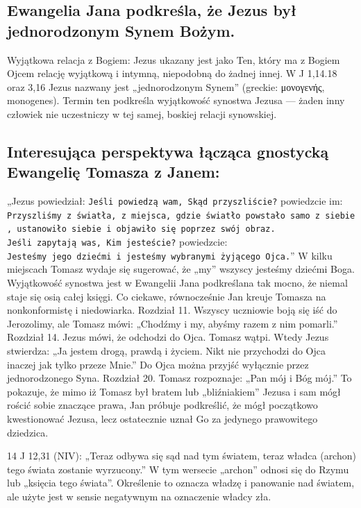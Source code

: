 \subsection{Ewangelia Jana podkreśla, że Jezus był jednorodzonym Synem Bożym.}\label{subsec:the-gospel-of-john-emphasizes-the-jesus-was-the-only-begotten-son-of-god.}

Wyjątkowa relacja z Bogiem:
Jezus ukazany jest jako Ten, który ma z Bogiem Ojcem relację wyjątkową i intymną, niepodobną do żadnej innej.
W J 1,14.18 oraz 3,16 Jezus nazwany jest „jednorodzonym Synem” (greckie: μονογενής, monogenes).
Termin ten podkreśla wyjątkowość synostwa Jezusa — żaden inny człowiek nie uczestniczy w tej samej, boskiej relacji synowskiej.

\subsection{Interesująca perspektywa łącząca gnostycką Ewangelię Tomasza z Janem:}\label{subsec:here-there-is-a-very-interesting-perspective-linking-the-gnostic-gospel-of-thomas-with-john}

„Jezus powiedział: \texttt{Jeśli\ powiedzą\ wam,\ Skąd\ przyszliście?} powiedzcie im: \texttt{Przyszliśmy\ z\ światła,\ z\ miejsca,\ gdzie\ światło\ powstało\ samo\ z\ siebie,\ ustanowiło\ siebie\ i\ objawiło\ się\ poprzez\ swój\ obraz.}
\texttt{Jeśli\ zapytają\ was,\ Kim\ jesteście?} powiedzcie: \texttt{Jesteśmy\ jego\ dziećmi\ i\ jesteśmy\ wybranymi\ żyjącego\ Ojca.}”
W kilku miejscach Tomasz wydaje się sugerować, że „my” wszyscy jesteśmy dziećmi Boga.
Wyjątkowość synostwa jest w Ewangelii Jana podkreślana tak mocno, że niemal staje się osią całej księgi.
Co ciekawe, równocześnie Jan kreuje Tomasza na nonkonformistę i niedowiarka.
Rozdział 11.
Wszyscy uczniowie boją się iść do Jerozolimy, ale Tomasz mówi:
„Chodźmy i my, abyśmy razem z nim pomarli.”
Rozdział 14.
Jezus mówi, że odchodzi do Ojca.
Tomasz wątpi.
Wtedy Jezus stwierdza:
„Ja jestem drogą, prawdą i życiem.
Nikt nie przychodzi do Ojca inaczej jak tylko przeze Mnie.”
Do Ojca można przyjść wyłącznie przez jednorodzonego Syna.
Rozdział 20.
Tomasz rozpoznaje:
„Pan mój i Bóg mój.”
To pokazuje, że mimo iż Tomasz był bratem lub „bliźniakiem” Jezusa i sam mógł rościć sobie znaczące prawa, Jan próbuje podkreślić, że mógł początkowo kwestionować Jezusa, lecz ostatecznie uznał Go za jedynego prawowitego dziedzica.

14 J 12,31 (NIV): „Teraz odbywa się sąd nad tym światem, teraz władca (archon) tego świata zostanie wyrzucony.”
W tym wersecie „archon” odnosi się do Rzymu lub „księcia tego świata”.
Określenie to oznacza władzę i panowanie nad światem, ale użyte jest w sensie negatywnym na oznaczenie władcy zła.

